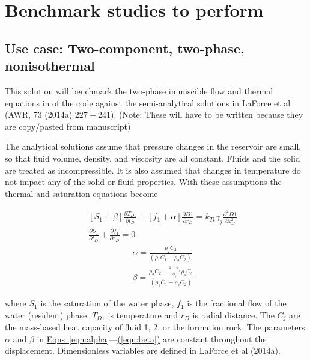 \documentclass[12pt]{report}
\begin{document}
\chapter{Benchmark studies to perform}


\section{Use case: Two-component, two-phase, nonisothermal}

This solution will benchmark the two-phase immiscible flow and thermal equations in of the code against the semi-analytical solutions in LaForce et al (AWR, 73 (2014a) $227 - 241$). (Note: These will have to be written because they are copy/pasted from manuscript)

The analytical solutions assume that pressure changes in the reservoir are small, so that fluid volume, density, and viscosity are all constant. Fluids and the solid are treated as incompressible.  It is also assumed that changes in temperature do not impact any of the solid or fluid properties.  With these assumptions the thermal and saturation equations become

\begin{eqnarray}
&&\left[ S_1  + \beta \right]\frac{\partial T_{D1}}{\partial t_D} +
\left[  f_1  + \alpha\right] \frac{\partial {D1}}{\partial r_D} = k_{Tt}\gamma_j \frac{\partial^2 {D1}}{\partial z_D^2} \label{eqn:generic_T}\\
&&\frac{\partial S_1}{\partial t_D } + \frac{\partial f_1}{\partial r_D } = 0 \label{eqn:generic_S}
\end{eqnarray}
\begin{eqnarray}
&&\alpha = \frac{\rho_2  C_2}{\left(\rho_1  C_1  - \rho_2  C_2 \right)} \label{eqn:alpha}\\
&&\beta = \frac{\rho_2  C_2  + \frac{ 1-\phi_r }{\phi_r}\rho_s C_s }{\left(\rho_1  C_1  - \rho_2  C_2 \right)} \label{eqn:beta}
\end{eqnarray}

\noindent where $S_1$ is the saturation of the water phase, $f_1$ is
the fractional flow of the water (resident) phase, $T_{D1}$ is
temperature and $r_D$ is radial distance.  The $C_j$ are the
mass-based heat capacity of fluid 1, 2, or the formation rock.  The
parameters $\alpha$ and $\beta$ in
\hyperref[eqn:alpha]{Eqns~\ref*{eqn:alpha}}---\hyperref[eqn:beta]{(\ref*{eqn:beta})}
are constant throughout the displacement.  Dimensionless variables are
defined in LaForce et al (2014a).
\end{document}
